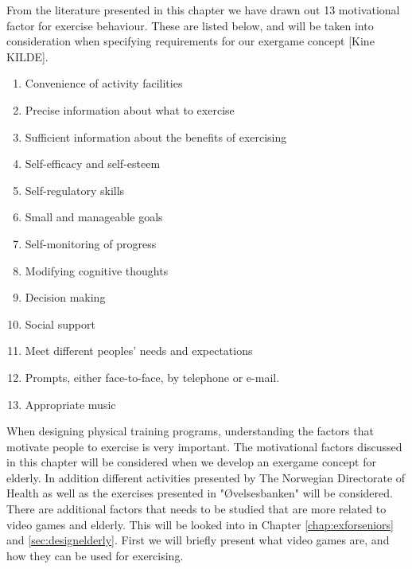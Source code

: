 From the literature presented in this chapter we have drawn out 13 motivational factor for exercise behaviour. These are listed below, and will be taken into consideration when specifying requirements for our exergame concept [Kine KILDE]. 

\begin{enumerate}[{m}.1]
\item Convenience of activity facilities
\item Precise information about what to exercise 
\item Sufficient information about the benefits of exercising
\item Self-efficacy and self-esteem
\item Self-regulatory skills
\item Small and manageable goals
\item Self-monitoring of progress
\item Modifying cognitive thoughts 
\item Decision making
\item Social support
\item Meet different peoples' needs and expectations
\item Prompts, either face-to-face, by telephone or e-mail. 
\item Appropriate music
\end{enumerate} 

\bigskip


When designing physical training programs, understanding the factors that motivate people to exercise is very important. The motivational factors discussed in this chapter will be considered when we develop an exergame concept for elderly. In addition different activities presented by The Norwegian Directorate of Health as well as the exercises presented in "Øvelsesbanken" will be considered. There are additional factors that needs to be studied that are more related to video games and elderly. This will be looked into in Chapter \ref{chap:exforseniors} and \ref{sec:designelderly}. First we will briefly present what video games are, and how they can be used for exercising. 




